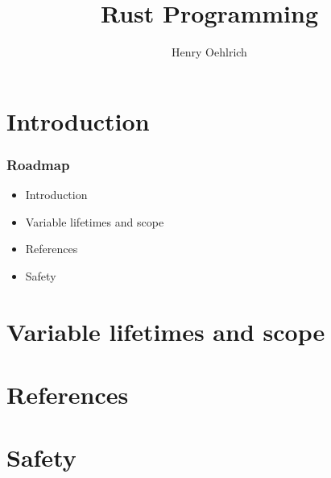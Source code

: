 \documentclass{beamer}
\title{Rust Programming}
\author{Henry Oehlrich}
\begin{document}
\maketitle{}

\section{Introduction}
\begin{frame}
	\frametitle{Roadmap}
	\begin{itemize}
        \item Introduction
        \item Variable lifetimes and scope
        \item References
        \item Safety
	\end{itemize}
\end{frame}

\section{Variable lifetimes and scope}
\begin{frame}
\end{frame}

\section{References}
\begin{frame}
\end{frame}

\section{Safety}
\begin{frame}
\end{frame}
\end{document}
